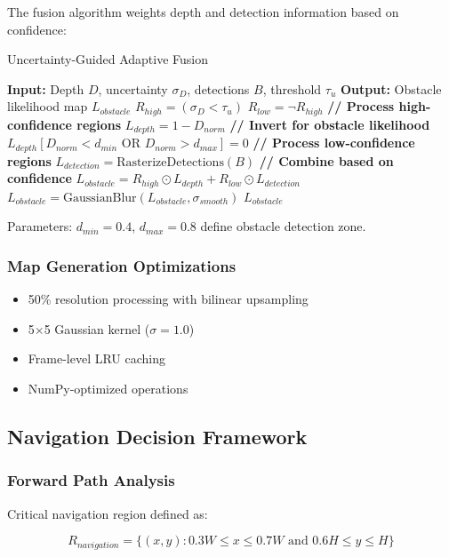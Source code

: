 \documentclass[12pt,oneside]{book}
\begin{document}
The fusion algorithm weights depth and detection information based on confidence:

\begin{algorithm}
\caption{Uncertainty-Guided Adaptive Fusion}
\begin{algorithmic}
\STATE \textbf{Input:} Depth $D$, uncertainty $\sigma_D$, detections $B$, threshold $\tau_u$
\STATE \textbf{Output:} Obstacle likelihood map $L_{obstacle}$
\STATE $R_{high} = (\sigma_D < \tau_u)$
\STATE $R_{low} = \neg R_{high}$
\STATE \textbf{// Process high-confidence regions}
\STATE $L_{depth} = 1 - D_{norm}$ \textbf{// Invert for obstacle likelihood}
\STATE $L_{depth}[D_{norm} < d_{min} \text{ OR } D_{norm} > d_{max}] = 0$
\STATE \textbf{// Process low-confidence regions}
\STATE $L_{detection} = \text{RasterizeDetections}(B)$
\STATE \textbf{// Combine based on confidence}
\STATE $L_{obstacle} = R_{high} \odot L_{depth} + R_{low} \odot L_{detection}$
\STATE $L_{obstacle} = \text{GaussianBlur}(L_{obstacle}, \sigma_{smooth})$
\RETURN $L_{obstacle}$
\end{algorithmic}
\end{algorithm}

Parameters: $d_{min} = 0.4$, $d_{max} = 0.8$ define obstacle detection zone.

\subsubsection{Map Generation Optimizations}
\begin{itemize}
\item 50\% resolution processing with bilinear upsampling
\item 5$\times$5 Gaussian kernel ($\sigma = 1.0$)
\item Frame-level LRU caching
\item NumPy-optimized operations
\end{itemize}

\subsection{Navigation Decision Framework}

\subsubsection{Forward Path Analysis}

Critical navigation region defined as:

\begin{equation}
R_{navigation} = \{(x,y) : 0.3W \leq x \leq 0.7W \text{ and } 0.6H \leq y \leq H\}
\label{eq:navigation_region_detailed}
\end{equation}
\end{document}
